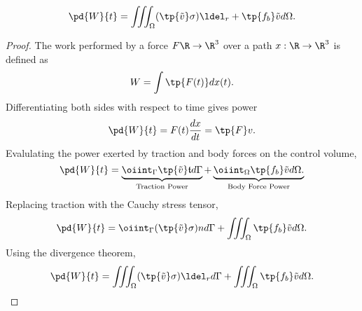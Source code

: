\begin{thm}
    \begin{equation}
        \pd{W}{t} = \iiint_\Omega (\tp{\tilde{v}} \sigma) \ldel_r + \tp{f_b} \tilde{v} d\Omega.
    \end{equation}
\end{thm}
\begin{proof}
    The work performed by a force $F\R\to \R^3$ over a path $x:\R\to \R^3$
    is defined as
    \begin{equation}
        W = \int \tp{F(t)} dx(t).
    \end{equation}
    Differentiating both sides with respect to time gives power
    \begin{equation}
        \pd{W}{t} = F(t) \frac{dx}{dt} = \tp{F} v.
    \end{equation}
    Evalulating the power exerted by traction and body forces on the control volume,
    \begin{equation}
        \pd{W}{t} =
        \underbrace{\oiint_\Gamma \tp{\tilde{v}} \mathfrak{t} d\Gamma}_{\text{Traction Power}} +
        \underbrace{\oiint_\Omega \tp{f_b}\tilde{v} d\Omega.}_{\text{Body Force Power}}
    \end{equation}
    Replacing traction with the Cauchy stress tensor,
    \begin{equation}
        \pd{W}{t} = \oiint_\Gamma (\tp{\tilde{v}} \sigma) n d\Gamma + \iiint_\Omega \tp{f_b} \tilde{v} d\Omega.
    \end{equation}
    Using the divergence theorem,
    \begin{equation}
        \pd{W}{t} = \iiint_\Omega (\tp{\tilde{v}} \sigma) \ldel_r d\Gamma + \iiint_\Omega \tp{f_b} \tilde{v} d\Omega.
    \end{equation}
\end{proof}

